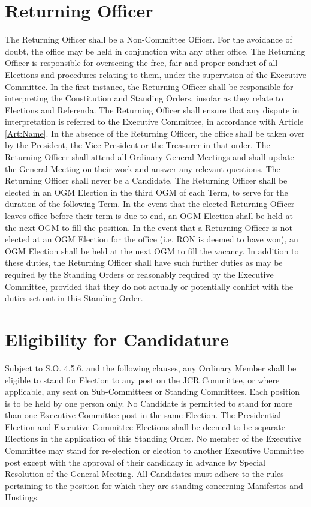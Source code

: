 \section{Returning Officer}
\npara The Returning Officer shall be a Non-Committee Officer.  For the avoidance of doubt, the office may be held in conjunction with any other office.
\npara The Returning Officer is responsible for overseeing the free, fair and proper conduct of all Elections and procedures relating to them, under the supervision of the Executive Committee.
\npara In the first instance, the Returning Officer shall be responsible for interpreting the Constitution and Standing Orders, insofar as they relate to Elections and Referenda.  The Returning Officer shall ensure that any dispute in interpretation is referred to the Executive Committee, in accordance with Article \ref{Art:Name}.
\npara In the absence of the Returning Officer, the office shall be taken over by the President, the Vice President or the Treasurer in that order.
\npara The Returning Officer shall attend all Ordinary General Meetings and shall update the General Meeting on their work and answer any relevant questions.
\npara The Returning Officer shall never be a Candidate.
\npara The Returning Officer shall be elected in an OGM Election in the third OGM of each Term, to serve for the duration of the following Term.
\npara In the event that the elected Returning Officer leaves office before their term is due to end, an OGM Election shall be held at the next OGM to fill the position.
\npara In the event that a Returning Officer is not elected at an OGM Election for the office (i.e. RON is deemed to have won), an OGM Election shall be held at the next OGM to fill the vacancy.
\npara In addition to these duties, the Returning Officer shall have such further duties as may be required by the Standing Orders or reasonably required by the Executive Committee, provided that they do not actually or potentially conflict with the duties set out in this Standing Order.
\section{Eligibility for Candidature}
\npara Subject to S.O. 4.5.6. and the following clauses, any Ordinary Member shall be eligible to stand for Election to any post on the JCR Committee, or where applicable, any seat on Sub-Committees or Standing Committees.
% 
% 
\npara Each position is to be held by one person only.
\npara No Candidate is permitted to stand for more than one Executive Committee post in the same Election.  The Presidential Election and Executive Committee Elections shall be deemed to be separate Elections in the application of this Standing Order.
\npara No member of the Executive Committee may stand for re-election or election to another Executive Committee post except with the approval of their candidacy in advance by Special Resolution of the General Meeting.
\npara All Candidates must adhere to the rules pertaining to the position for which they are standing concerning Manifestos and Hustings.
